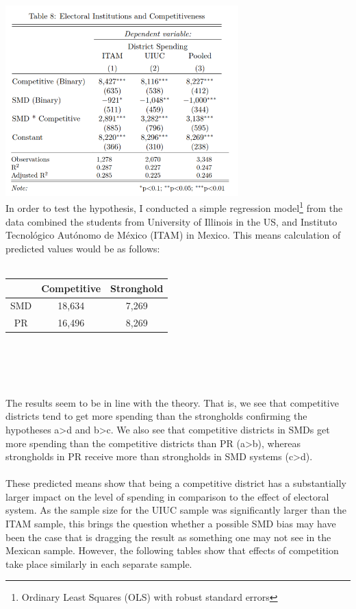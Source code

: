 \documentclass{article}
\begin{document}
\\
\includegraphics[width=90mm]{Regressions_All}\\
In order to test the hypothesis, I conducted a simple regression model\footnote{Ordinary Least Squares (OLS) with robust standard errors} from the data combined the students from University of Illinois in the US, and Instituto Tecnol\'{o}gico Aut\'{o}nomo de M\'{e}xico (ITAM) in Mexico. This means calculation of predicted values would be as follows:\\
\\
\begin{left}
	\begin{tabular}{ |c|c|c| } 
		\hline
		 & Competitive & Stronghold \\ 
		\hline
		SMD & 18,634 & 7,269 \\ 
		\hline
		PR & 16,496 & 8,269 \\ 
		\hline
	\end{tabular}
\end{left}\\
\\
\\
\\
The results seem to be in line with the theory. That is, we see that competitive districts tend to get more spending than the strongholds confirming the hypotheses a>d and b>c. We also see that competitive districts in SMDs get more spending than the competitive districts than PR (a>b), whereas strongholds in PR receive more than strongholds in SMD systems (c>d). \\
\\
These predicted means show that being a competitive district has a substantially larger impact on the level of spending in comparison to the effect of electoral system. As the sample size for the UIUC sample was significantly larger than the ITAM sample, this brings the question whether a possible SMD bias may have been the case that is dragging the result as something one may not see in the Mexican sample. However, the following tables show that effects of competition take place similarly in each separate sample.\\
\end{document}
